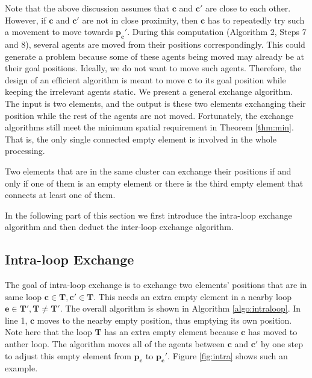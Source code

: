 Note that the above discussion assumes that $\mathbf{c}$ and $\mathbf{c'}$ are close to each other.
However, if $\mathbf{c}$ and $\mathbf{c'}$ are not in close proximity, then $\mathbf{c}$ has to repeatedly try such a movement to move towards $\mathbf{p_c'}$. During this computation (Algorithm 2, Steps 7 and 8), several agents are moved from their positions correspondingly. This could generate a problem because some of these agents being moved may already be at their goal positions. Ideally, we do not want to move such agents. 
Therefore, the design of an efficient algorithm is meant to move $\mathbf{c}$ to its goal position while keeping the irrelevant agents static. We present a general exchange algorithm. The input is two elements, and the output is these two elements exchanging their position while the rest of the agents are not moved. Fortunately, the exchange algorithms still meet the minimum spatial requirement in Theorem \ref{thm:min}. That is, the only single connected empty element is involved in the whole processing.

\vspace*{0.05in}
\begin{lemma}
Two elements that are in the same cluster can exchange their positions if and only if one of them is an empty element or there is the third empty element that connects at least one of them. 
\label{lem:min}
\end{lemma}
\vspace*{0.05in}

In the following part of this section we first introduce the intra-loop exchange algorithm and then deduct the inter-loop exchange algorithm.
\subsection{Intra-loop Exchange}
The goal of intra-loop exchange is to exchange two elements' positions that are in same loop $\mathbf{c} \in \mathbf{T}, \mathbf{c'} \in \mathbf{T} $. This needs an extra empty element in a nearby loop $\mathbf{e} \in \mathbf{T'}, \mathbf{T} \neq \mathbf{T'}$. The overall algorithm is shown in Algorithm \ref{algo:intraloop}. In line 1, $\mathbf{c}$ moves to the nearby empty position, thus emptying its own position. Note here that the loop $\mathbf{T}$ has an extra empty element because $\mathbf{c}$ has moved to anther loop. The algorithm moves all of the agents between $\mathbf{c}$ and $\mathbf{c'}$ by one step to adjust this empty element from $\mathbf{p_c}$ to $\mathbf{p_c'}$.
Figure \ref{fig:intra} shows such an example. 


